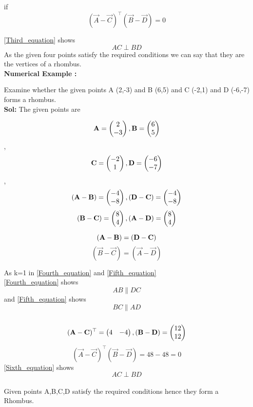 \documentclass{article}
\begin{document}
if 
\begin{equation}\label{Third_equation}
(\vec{A}-\vec{C} )^ \top ( \vec{B}-\vec{D} ) = 0 
\end{equation}

\ref{Third_equation} shows
$$AC \perp BD $$
{As the given four points satisfy the required conditions we can say that they are the vertices of a rhombus.}\\
\textbf{Numerical Example :}
 
{Examine whether the given points A (2,-3) and B (6,5) and C (-2,1) and D (-6,-7) forms a rhombus.}\\

 \textbf{Sol:}
 The given points are

$$\vec{A} = \myvec{2\\-3}, \vec{B} =\myvec{6\\5}$$,
$$\vec{C} =\myvec{-2\\1}, \vec{D} =\myvec{-6\\-7}$$,
$$(\vec{A}-\vec{B} ) = \myvec{-4\\-8}, (\vec{D}-\vec{C} ) = \myvec{-4\\-8}$$
$$(\vec{B}-\vec{C} ) = \myvec{8\\4}, (\vec{A}-\vec{D} ) = \myvec{8\\4}$$

\begin{equation}\label{Fourth_equation}
(\vec{A}-\vec{B} ) = (\vec{D}-\vec{C} )  \\
\end{equation}
\begin{equation}\label{Fifth_equation}
(\vec{B}-\vec{C} )  = (\vec{A}-\vec{D} ) 
\end{equation}

 {As k=1 in \ref{Fourth_equation} and \ref{Fifth_equation}}\\
 {}
\ref{Fourth_equation} shows $$ AB  {\parallel} DC $$ and \ref{Fifth_equation} shows $$BC \parallel AD $$\\
$$(\vec{A}-\vec{C} )^\top = \myvec{4&-4 }
,(\vec{B}-\vec{D} ) = \myvec{12\\12}$$
\begin{equation}\label{Sixth_equation}
(\vec{A}-\vec{C} )^ \top ( \vec{B}-\vec{D} ) = 48-48 = 0
\end{equation}
 \ref{Sixth_equation} shows
$$AC \perp BD $$\\ 
{Given points A,B,C,D satisfy the required 
conditions hence they form a Rhombus.}

\end{document}

